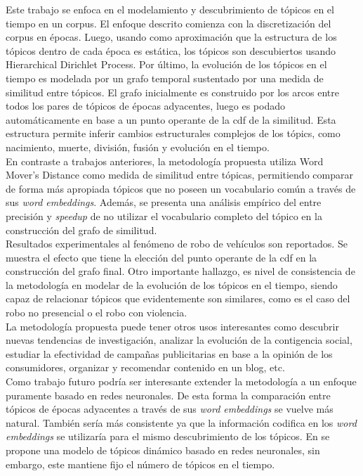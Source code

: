 Este trabajo se enfoca en el modelamiento y descubrimiento de tópicos en el tiempo en un corpus. El enfoque descrito comienza con la discretización del corpus en épocas. Luego, usando como aproximación que la estructura de los tópicos dentro de cada época es estática, los tópicos son descubiertos usando Hierarchical Dirichlet Process. Por último, la evolución de los tópicos en el tiempo es modelada por un grafo temporal sustentado por una medida de similitud entre tópicos. El grafo inicialmente es construido por los arcos entre todos los pares de tópicos de épocas adyacentes, luego es podado automáticamente en base a un punto operante de la cdf de la similitud. Esta estructura permite inferir cambios estructurales complejos de los tópics, como nacimiento, muerte, división, fusión y evolución en el tiempo.\\

En contraste a trabajos anteriores, la metodología propuesta utiliza Word Mover's Distance como medida de similitud entre tópicas, permitiendo comparar de forma más apropiada tópicos que no poseen un vocabulario común a través de sus \textit{word embeddings}. Además, se presenta una análisis empírico del  entre precisión y \textit{speedup} de no utilizar el vocabulario completo del tópico en la construcción del grafo de similitud.\\

Resultados experimentales al fenómeno de robo de vehículos son reportados. Se muestra el efecto que tiene la elección del punto operante de la cdf en la construcción del grafo final. Otro importante hallazgo, es nivel de consistencia de la metodología en modelar de la evolución de los tópicos en el tiempo, siendo capaz de relacionar tópicos que evidentemente son similares, como es el caso del robo no presencial o el robo con violencia.\\

La metodología propuesta puede tener otros usos interesantes como descubrir nuevas tendencias de investigación, analizar la evolución de la contigencia social, estudiar la efectividad de campañas publicitarias en base a la opinión de los consumidores, organizar y recomendar contenido en un blog, etc.\\

Como trabajo futuro podría ser interesante extender la metodología a un enfoque puramente basado en redes neuronales. De esta forma la comparación entre tópicos de épocas adyacentes a través de sus \textit{word embeddings} se vuelve más natural. También sería más consistente ya que la información codifica en los \textit{word embeddings} se utilizaría para el mismo descubrimiento de los tópicos. En \cite{dieng2019dynamic} se propone una modelo de tópicos dinámico basado en redes neuronales, sin embargo, este mantiene fijo el número de tópicos en el tiempo.

